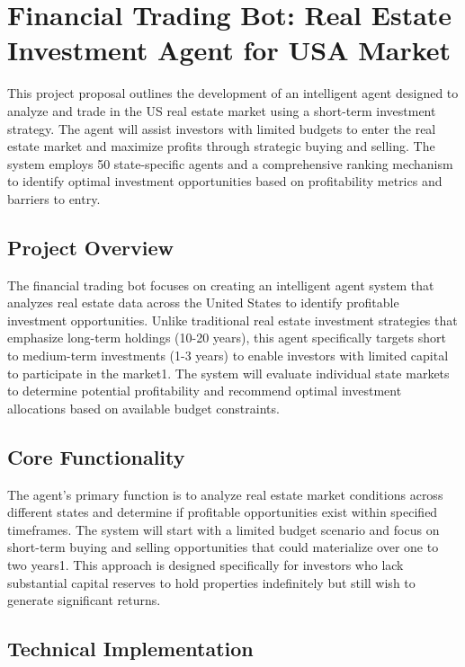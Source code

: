 \chapter*{Financial Trading Bot: Real Estate Investment Agent for USA Market}

This project proposal outlines the development of an intelligent agent designed to analyze and trade in the US real estate market using a short-term investment strategy. The agent will assist investors with limited budgets to enter the real estate market and maximize profits through strategic buying and selling. The system employs 50 state-specific agents and a comprehensive ranking mechanism to identify optimal investment opportunities based on profitability metrics and barriers to entry.


\section*{Project Overview}

The financial trading bot focuses on creating an intelligent agent system that analyzes real estate data across the United States to identify profitable investment opportunities. Unlike traditional real estate investment strategies that emphasize long-term holdings (10-20 years), this agent specifically targets short to medium-term investments (1-3 years) to enable investors with limited capital to participate in the market1. The system will evaluate individual state markets to determine potential profitability and recommend optimal investment allocations based on available budget constraints.


\section*{Core Functionality}

The agent's primary function is to analyze real estate market conditions across different states and determine if profitable opportunities exist within specified timeframes. The system will start with a limited budget scenario and focus on short-term buying and selling opportunities that could materialize over one to two years1. This approach is designed specifically for investors who lack substantial capital reserves to hold properties indefinitely but still wish to generate significant returns.


\section*{Technical Implementation}

